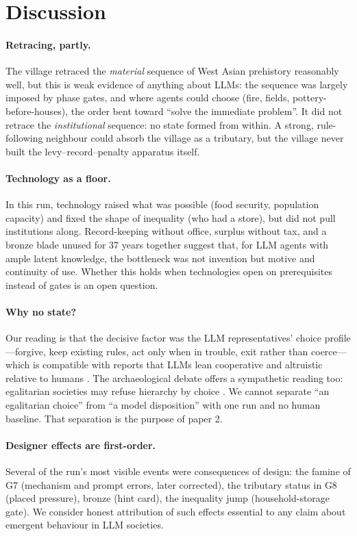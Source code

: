 \documentclass[11pt]{article}
\begin{document}
\section{Discussion}

\paragraph{Retracing, partly.} The village retraced the \emph{material} sequence of West Asian prehistory reasonably well, but this is weak evidence of anything about LLMs: the sequence was largely imposed by phase gates, and where agents could choose (fire, fields, pottery-before-houses), the order bent toward ``solve the immediate problem''. It did not retrace the \emph{institutional} sequence: no state formed from within. A strong, rule-following neighbour could absorb the village as a tributary, but the village never built the levy--record--penalty apparatus itself.

\paragraph{Technology as a floor.} In this run, technology raised what was possible (food security, population capacity) and fixed the shape of inequality (who had a store), but did not pull institutions along. Record-keeping without office, surplus without tax, and a bronze blade unused for 37 years together suggest that, for LLM agents with ample latent knowledge, the bottleneck was not invention but motive and continuity of use. Whether this holds when technologies open on prerequisites instead of gates is an open question.

\paragraph{Why no state?} Our reading is that the decisive factor was the LLM representatives' choice profile---forgive, keep existing rules, act only when in trouble, exit rather than coerce---which is compatible with reports that LLMs lean cooperative and altruistic relative to humans \citep{mei2024turing}. The archaeological debate offers a sympathetic reading too: egalitarian societies may refuse hierarchy by choice \citep{graeber2021dawn,boehm1999hierarchy}. We cannot separate ``an egalitarian choice'' from ``a model disposition'' with one run and no human baseline. That separation is the purpose of paper 2.

\paragraph{Designer effects are first-order.} Several of the run's most visible events were consequences of design: the famine of G7 (mechanism and prompt errors, later corrected), the tributary status in G8 (placed pressure), bronze (hint card), the inequality jump (household-storage gate). We consider honest attribution of such effects essential to any claim about emergent behaviour in LLM societies.
\end{document}
